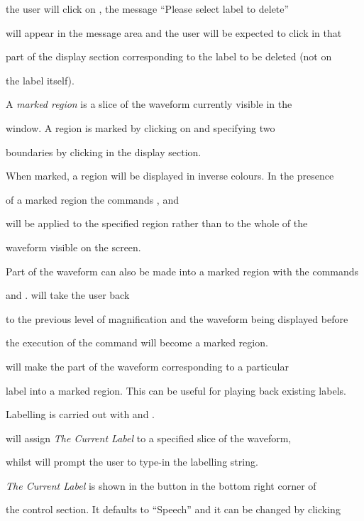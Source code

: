 the user will click on , the message ``Please select label to delete'' 


will appear in the message area and the user will be expected to click in that 


part of the display section corresponding to the label to be deleted (not on 


the label itself).





A {\em marked region} is a slice of the waveform currently visible in the 


window. A region is marked by clicking on  and specifying two 


boundaries by clicking in the display section. 


When marked, a region will be displayed in inverse colours. In the presence 


of a marked region the commands ,  and  


will be applied to the specified region rather than to the whole of the 


waveform visible on the screen. 


Part of the waveform can also be made into a marked region with the commands 


 and .  will take the user back 


to the previous level of magnification and the waveform being displayed before 


the execution of the command will become a marked region. 


 will make the part of the waveform corresponding to a particular 


label into a marked region. This can be useful for playing back existing labels. 





Labelling is carried out with  and . 


will assign {\em The Current Label} to a specified slice of the waveform,


whilst  will prompt the user to type-in the labelling string. 


{\em The Current Label} is shown in the button in the bottom right corner of 


the control section.  It defaults to ``Speech'' and it can be changed by clicking 



